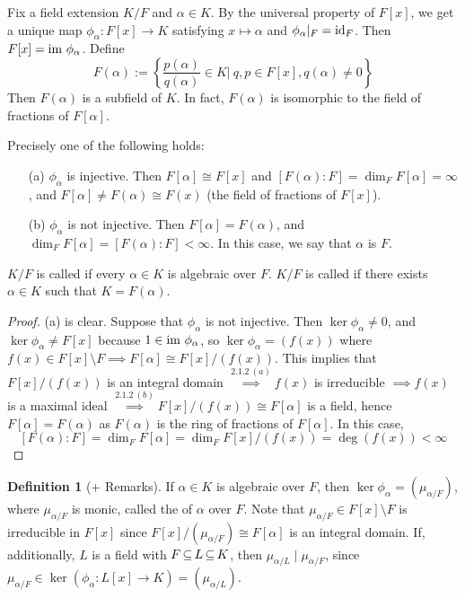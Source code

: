 \documentclass[11pt]{book}
\theoremstyle{definition}   \newtheorem{defn}[counter]{Definition} %
\newcommand{\bs}{\setminus}   \newcommand{\A}{\mathcal{A}}   \newcommand{\sy}{\textnormal{Syl}}   \newcommand{\size}[1]{\left| #1 \right|}
\DeclareMathOperator{\ra}{\rightarrow}   \DeclareMathOperator{\Poly}{\mathbf{P}}   \DeclareMathOperator{\spn}{\textnormal{span}}   \DeclareMathOperator{\aut}{\textnormal{Aut}}
\newcommand{\vs}{\vspace{8pt}}
\numberwithin{counter}{chapter}
\begin{document}
\vs

Fix a field extension $K/F$ and $\alpha \in K$. By the universal property of $F[x]$, we get a unique map $\phi_\alpha : F[x] \ra K$ satisfying $x \mapsto \alpha$ and $\phi_\alpha |_F = \textnormal{id}_F$. Then $F[x] = \textnormal{im } \phi_\alpha$. Define
	\[F(\alpha) := \left\{\frac{p(\alpha)}{q(\alpha)} \in K  \bigg| \ q,p \in F[x], q(\alpha) \ne 0 \right\} \]
Then $F(\alpha)$ is a subfield of $K$. In fact, $F(\alpha)$ is isomorphic to the field of fractions of $F[\alpha]$.

\vs

\begin{lemma}[+ Definition]
Precisely one of the following holds:
\begin{enumerate}
\item[(a)] $\phi_\alpha$ is injective. Then $F[\alpha] \cong F[x]$ and $[F(\alpha) : F] = \dim_F F[\alpha] = \infty$, and $F[\alpha] \ne F(\alpha) \cong F(x)$ (the field of fractions of $F[x]$).
\item[(b)] $\phi_\alpha$ is not injective. Then $F[\alpha] = F(\alpha)$, and $\dim_F F[\alpha] = [F(\alpha) : F] < \infty$. In this case, we say that $\alpha$ is  $F$. 
\end{enumerate}

$K/F$ is called  if every $\alpha \in K$ is algebraic over $F$. $K/F$ is called  if there exists $\alpha \in K$ such that $K = F(\alpha)$. 
\end{lemma}

\begin{proof}
(a) is clear. Suppose that $\phi_\alpha$ is not injective. Then $\ker \phi_\alpha \ne 0$, and $\ker \phi_\alpha \ne F[x]$ because $1 \in \textnormal{im } \phi_\alpha$, so $\ker \phi_\alpha = (f(x))$ where $f(x) \in F[x]\bs F \implies F[\alpha] \cong F[x]/(f(x))$. This implies that $F[x]/(f(x))$ is an integral domain $\overset{2.1.2 \ (a)}{\implies} f(x)$ is irreducible $ \implies f(x)$ is a maximal ideal $\overset{2.1.2 \ (b)}{\implies} F[x]/(f(x)) \cong F[\alpha]$ is a field, hence $F[\alpha] = F(\alpha)$ as $F(\alpha)$ is the ring of fractions of $F[\alpha]$. In this case, 
	\[[F(\alpha) : F] = \dim_F F[\alpha] = \dim_F F[x]/(f(x)) = \deg(f(x)) < \infty \]
\end{proof}

\vs

\begin{defn}[+ Remarks]
If $\alpha \in K$ is algebraic over $F$, then $\ker \phi_\alpha = (\mu_{\alpha/F})$, where $\mu_{\alpha/F}$ is monic, called the  of $\alpha$ over $F$. Note that $\mu_{\alpha/F} \in F[x]\bs F$ is irreducible in $F[x]$ since $F[x]/(\mu_{\alpha/F}) \cong F[\alpha]$ is an integral domain. If, additionally, $L$ is a field with $F \operatorname{\subseteq} L \operatorname{\subseteq} K$, then $\mu_{\alpha/L} \mid \mu_{\alpha/F}$, since $\mu_{\alpha/F} \in \ker(\phi_\alpha : L[x] \ra K) = (\mu_{\alpha/L})$. 
\end{defn}
\end{document}
